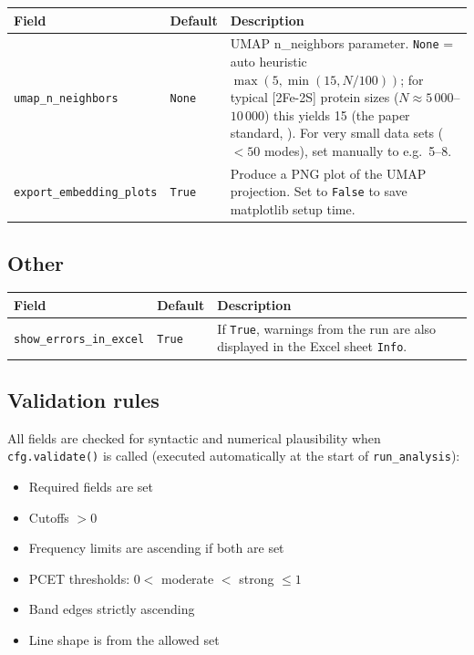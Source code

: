 \documentclass[11pt,a4paper,twoside]{article}
\theoremstyle{remark}
\begin{document}
\begin{longtable}{p{} p{} p{}}
\toprule
\textbf{Field} & \textbf{Default} & \textbf{Description} \\
\midrule
\endhead
\texttt{umap\_n\_neighbors} & \texttt{None} & UMAP n\_neighbors
  parameter. \texttt{None} = auto heuristic
  $\max(5, \min(15, N/100))$; for typical [2Fe-2S] protein sizes
  ($N \approx 5\,000$--$10\,000$) this yields 15 (the paper
  standard, \cite{McInnes2018}). For very small data sets
  ($< 50$ modes), set manually to e.g.\ 5--8. \\
\texttt{export\_embedding\_plots} & \texttt{True} & Produce a PNG
  plot of the UMAP projection. Set to \texttt{False} to save
  matplotlib setup time. \\
\bottomrule
\end{longtable}

\subsection{Other}

\begin{longtable}{p{} p{} p{}}
\toprule
\textbf{Field} & \textbf{Default} & \textbf{Description} \\
\midrule
\endhead
\texttt{show\_errors\_in\_excel} & \texttt{True} & If \texttt{True},
  warnings from the run are also displayed in the Excel sheet
  \texttt{Info}. \\
\bottomrule
\end{longtable}

\subsection{Validation rules}

All fields are checked for syntactic and numerical plausibility
when \texttt{cfg.validate()} is called (executed automatically at
the start of \texttt{run\_analysis}):

\begin{itemize}
  \item Required fields are set
  \item Cutoffs $> 0$
  \item Frequency limits are ascending if both are set
  \item PCET thresholds: $0 < $ moderate $< $ strong $\leq 1$
  \item Band edges strictly ascending
  \item Line shape is from the allowed set
\end{itemize}
\end{document}
